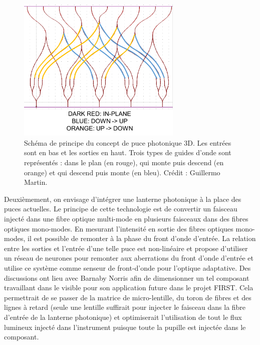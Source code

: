 \begin{figure}[ht!]
    \centering
    \includegraphics[width=0.7\textwidth]{Figure_Chap1/Martin2022_FIRST573D_Figure1.png}
    \caption[Schéma de principe du concept de puce photonique 3D.]{Schéma de principe du concept de puce photonique 3D. Les entrées sont en bas et les sorties en haut. Trois types de guides d'onde sont représentés : dans le plan (en rouge), qui monte puis descend (en orange) et qui descend puis monte (en bleu). Crédit : Guillermo Martin.}
    \label{fig:Chip5T3D}
\end{figure}

Deuxièmement, on envisage d'intégrer une lanterne photonique \citep{leonsaval2005} à la place des puces actuelles. Le principe de cette technologie est de convertir un faisceau injecté dans une fibre optique multi-mode en plusieurs faisceaux dans des fibres optiques mono-modes. En mesurant l'intensité en sortie des fibres optiques mono-modes, il est possible de remonter à la phase du front d'onde d'entrée. La relation entre les sorties et l'entrée d'une telle puce est non-linéaire et \cite{norris2020} propose d'utiliser un réseau de neurones pour remonter aux aberrations du front d'onde d'entrée et utilise ce système comme senseur de front-d'onde pour l'optique adaptative. Des discussions ont lieu avec Barnaby Norris afin de dimensionner un tel composant travaillant dans le visible pour son application future dans le projet \ac{FIRST}. Cela permettrait de se passer de la matrice de micro-lentille, du toron de fibres et des lignes à retard (seule une lentille suffirait pour injecter le faisceau dans la fibre d'entrée de la lanterne photonique) et optimiserait l'utilisation de tout le flux lumineux injecté dans l'instrument puisque toute la pupille est injectée dans le composant.


